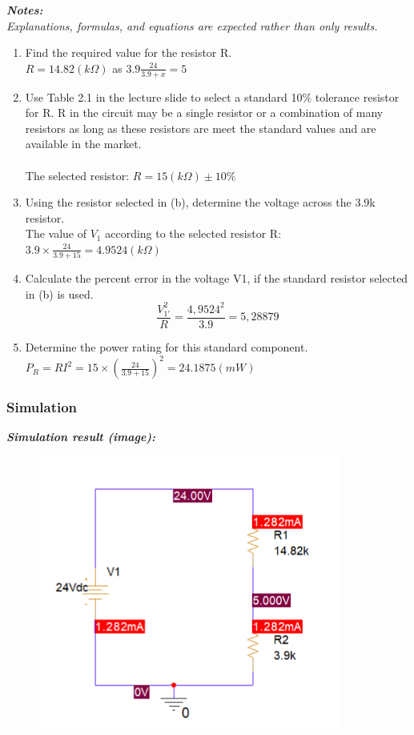 \textit{\textbf{Notes:}}\\
\textit{Explanations, formulas, and equations are expected rather than only results.}\\

\begin{enumerate}[label=\alph*.]
    \item Find the required value for the resistor R.\bigskip\\
          $R = 14.82 (k\Omega)$ as $3.9 \frac{24}{3.9+x} = 5$\medskip
    \item Use Table 2.1 in the lecture slide to select a standard 10\% tolerance resistor for R. R in the circuit may be a single resistor or a combination of many resistors as long as these resistors are meet the standard values and are available in the market.\bigskip\\
          \\
          The selected resistor: $R = 15 (k\Omega) \pm 10\%$\bigskip
    \item Using the resistor selected in (b), determine the voltage across the 3.9k resistor.\bigskip\\
          The value of $V_1$ according to the selected resistor R:$3.9 \times \frac{24}{3.9 + 15} = 4.9524 (k\Omega)$\medskip
    \item Calculate the percent error in the voltage V1, if the standard resistor selected in (b) is used.\\
          $$\frac{V_{1'}^{2}}{R} = \frac{4,9524^2}{3.9} = 5,28879 $$
    \item Determine the power rating for this standard component.\bigskip\\
          $P_R = RI^2 = 15 \times \left(\frac{24}{3.9+15}\right)^2 = 24.1875 (mW)$\dotfill\
\end{enumerate}

\subsubsection{Simulation}
\textit{\textbf{Simulation result (image):}}
\begin{figure}[H]
    \centering
    \includegraphics[width = 10cm]{source/picture/bai_1/ex5_sim.png}
\end{figure}

